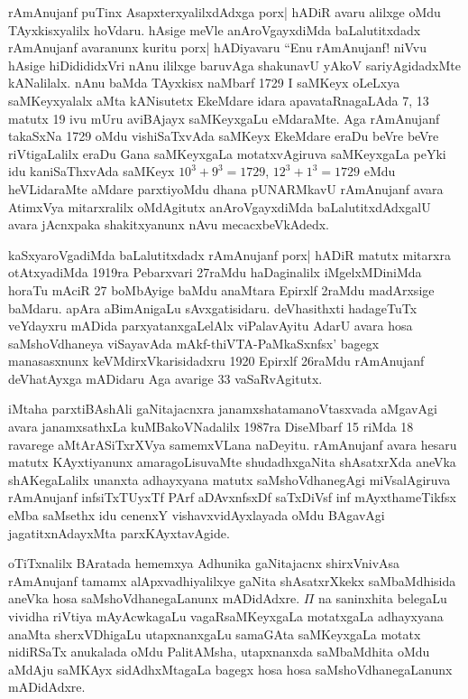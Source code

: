 rAmAnujanf puTinx AsapxterxyalilxdAdxga porx| hADiR avaru alilxge oMdu TAyxkisxyalilx hoVdaru. hAsige meVle anAroVgayxdiMda baLalutitxdadx rAmAnujanf avaranunx kuritu porx| hADiyavaru ``Enu rAmAnujanf! niVvu hAsige hiDidididxVri nAnu ililxge baruvAga shakunavU yAkoV sariyAgidadxMte kANalilalx. nAnu baMda TAyxkisx naMbarf {\rm 1729} I saMKeyx oLeLxya saMKeyxyalalx aMta kANisutetx EkeMdare idara apavataRnagaLAda {\rm 7, 13} matutx {\rm 19} ivu mUru aviBAjayx saMKeyxgaLu eMdaraMte. Aga rAmAnujanf takaSxNa {\rm 1729} oMdu vishiSaTxvAda saMKeyx EkeMdare eraDu beVre beVre riVtigaLalilx eraDu Gana saMKeyxgaLa motatxvAgiruva saMKeyxgaLa peYki idu kaniSaThxvAda saMKeyx $10^{3}+9^{3}=1729$, $12^{3}+1^{3}=1729$ eMdu heVLidaraMte aMdare parxtiyoMdu dhana pUNARMkavU rAmAnujanf avara AtimxVya mitarxralilx oMdAgitutx anAroVgayxdiMda baLalutitxdAdxgalU avara jAcnxpaka shakitxyanunx nAvu mecacxbeVkAdedx.

kaSxyaroVgadiMda baLalutitxdadx rAmAnujanf porx| hADiR matutx mitarxra otAtxyadiMda {\rm 1919}ra Pebarxvari {\rm 27}raMdu haDaginalilx iMgelxMDiniMda horaTu mAciR {\rm 27} boMbAyige baMdu anaMtara Epirxlf {\rm 2}raMdu madArxsige baMdaru. apAra aBimAnigaLu sAvxgatisidaru. deVhasithxti hadageTuTx veYdayxru mADida parxyatanxgaLelAlx viPalavAyitu AdarU avara hosa saMshoVdhaneya viSayavAda mAkf-thiVTA-PaMkaSxnfsx' bagegx manasasxnunx keVMdirxVkarisidadxru {\rm 1920} Epirxlf {\rm 26}raMdu rAmAnujanf deVhatAyxga mADidaru Aga avarige {\rm 33} vaSaRvAgitutx.

iMtaha parxtiBAshAli gaNitajacnxra janamxshatamanoVtasxvada aMgavAgi avara janamxsathxLa kuMBakoVNadalilx {\rm 1987}ra DiseMbarf {\rm 15} riMda {\rm 18} ravarege aMtArASiTxrXVya samemxVLana naDeyitu. rAmAnujanf avara hesaru matutx KAyxtiyanunx amaragoLisuvaMte shudadhxgaNita shAsatxrXda aneVka shAKegaLalilx unanxta adhayxyana matutx saMshoVdhanegAgi miVsalAgiruva rAmAnujanf infsiTxTUyxTf PArf aDAvxnfsxDf saTxDiVsf inf mAyxthameTikfsx eMba saMsethx idu cenenxY vishavxvidAyxlayada oMdu BAgavAgi jagatitxnAdayxMta parxKAyxtavAgide.

oTiTxnalilx BAratada hememxya Adhunika gaNitajacnx shirxVnivAsa rAmAnujanf tamamx alApxvadhiyalilxye gaNita shAsatxrXkekx saMbaMdhisida aneVka hosa saMshoVdhanegaLanunx mADidAdxre. $\Pi$ na saninxhita belegaLu vividha riVtiya mAyAcwkagaLu vagaRsaMKeyxgaLa motatxgaLa adhayxyana anaMta sherxVDhigaLu utapxnanxgaLu samaGAta saMKeyxgaLa motatx nidiRSaTx anukalada oMdu PalitAMsha, utapxnanxda saMbaMdhita oMdu aMdAju saMKAyx sidAdhxMtagaLa bagegx hosa hosa saMshoVdhanegaLanunx mADidAdxre.

